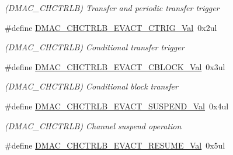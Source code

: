 \begin{DoxyCompactItemize}
\begin{DoxyCompactList}\small\item\em (D\+M\+A\+C\+\_\+\+C\+H\+C\+T\+R\+L\+B) Transfer and periodic transfer trigger \end{DoxyCompactList}\item 
\hypertarget{group___s_a_m_l21___d_m_a_c_ga4cf090f0ab1ac7d1231fb79627925227}{}\#define \hyperlink{group___s_a_m_l21___d_m_a_c_ga4cf090f0ab1ac7d1231fb79627925227}{D\+M\+A\+C\+\_\+\+C\+H\+C\+T\+R\+L\+B\+\_\+\+E\+V\+A\+C\+T\+\_\+\+C\+T\+R\+I\+G\+\_\+\+Val}~0x2ul\label{group___s_a_m_l21___d_m_a_c_ga4cf090f0ab1ac7d1231fb79627925227}

\begin{DoxyCompactList}\small\item\em (D\+M\+A\+C\+\_\+\+C\+H\+C\+T\+R\+L\+B) Conditional transfer trigger \end{DoxyCompactList}\item 
\hypertarget{group___s_a_m_l21___d_m_a_c_ga87b04d4f4a880d5fab6638ae0281a535}{}\#define \hyperlink{group___s_a_m_l21___d_m_a_c_ga87b04d4f4a880d5fab6638ae0281a535}{D\+M\+A\+C\+\_\+\+C\+H\+C\+T\+R\+L\+B\+\_\+\+E\+V\+A\+C\+T\+\_\+\+C\+B\+L\+O\+C\+K\+\_\+\+Val}~0x3ul\label{group___s_a_m_l21___d_m_a_c_ga87b04d4f4a880d5fab6638ae0281a535}

\begin{DoxyCompactList}\small\item\em (D\+M\+A\+C\+\_\+\+C\+H\+C\+T\+R\+L\+B) Conditional block transfer \end{DoxyCompactList}\item 
\hypertarget{group___s_a_m_l21___d_m_a_c_gacb1322d1f22aee0ec2daecb1c51dbbc4}{}\#define \hyperlink{group___s_a_m_l21___d_m_a_c_gacb1322d1f22aee0ec2daecb1c51dbbc4}{D\+M\+A\+C\+\_\+\+C\+H\+C\+T\+R\+L\+B\+\_\+\+E\+V\+A\+C\+T\+\_\+\+S\+U\+S\+P\+E\+N\+D\+\_\+\+Val}~0x4ul\label{group___s_a_m_l21___d_m_a_c_gacb1322d1f22aee0ec2daecb1c51dbbc4}

\begin{DoxyCompactList}\small\item\em (D\+M\+A\+C\+\_\+\+C\+H\+C\+T\+R\+L\+B) Channel suspend operation \end{DoxyCompactList}\item 
\hypertarget{group___s_a_m_l21___d_m_a_c_ga7356b082779dc3467dd5003f8ed8c01b}{}\#define \hyperlink{group___s_a_m_l21___d_m_a_c_ga7356b082779dc3467dd5003f8ed8c01b}{D\+M\+A\+C\+\_\+\+C\+H\+C\+T\+R\+L\+B\+\_\+\+E\+V\+A\+C\+T\+\_\+\+R\+E\+S\+U\+M\+E\+\_\+\+Val}~0x5ul\label{group___s_a_m_l21___d_m_a_c_ga7356b082779dc3467dd5003f8ed8c01b}


\end{DoxyCompactItemize}
